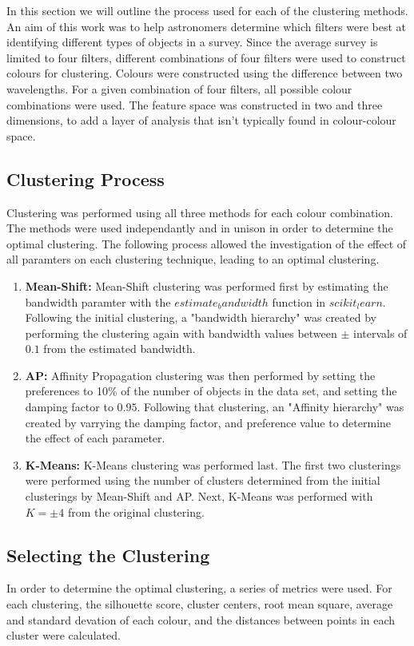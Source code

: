 In this section we will outline the process used for each of the clustering methods.
An aim of this work was to help astronomers determine which filters were best at identifying different types of objects in a survey. 
Since the average survey is limited to four filters, different combinations of four filters were used to construct colours for clustering. 
Colours were constructed using the difference between two wavelengths. For a given combination of four filters, all possible colour combinations were used. %
The feature space was constructed in two and three dimensions, to add a layer of analysis that isn't typically found in colour-colour space.

\subsection{Clustering Process}
Clustering was performed using all three methods for each colour combination. 
The methods were used independantly and in unison in order to determine the optimal clustering.
The following process allowed the investigation of the effect of all paramters on each clustering technique, leading to an optimal clustering. 
\begin{enumerate}
\item \textbf{Mean-Shift:} Mean-Shift clustering was performed first by estimating the bandwidth paramter with the $estimate_bandwidth$ function in $scikit_learn$.
Following the initial clustering, a "bandwidth hierarchy" was created by performing the clustering again with bandwidth values between $\pm$ intervals of $0.1$ from the estimated bandwidth.

\item \textbf{AP:} Affinity Propagation clustering was then performed by setting the preferences to 10\% of the number of objects in the data set, and setting the damping factor to $0.95$.
Following that clustering, an "Affinity hierarchy" was created by varrying the damping factor, and preference value to determine the effect of each parameter. 

\item \textbf{K-Means:} K-Means clustering was performed last.
The first two clusterings were performed using the number of clusters determined from the initial clusterings by Mean-Shift and AP.
Next, K-Means was performed with $K = \pm 4$ from the original clustering.
\end{enumerate}
\subsection{Selecting the Clustering}
In order to determine the optimal clustering, a series of metrics were used.
For each clustering, the silhouette score, cluster centers, root mean square, average and standard devation of each colour, and the distances between points in each cluster were calculated. 
